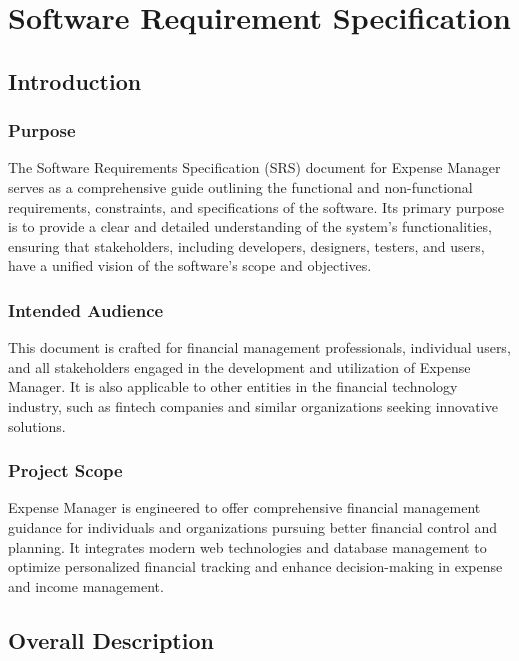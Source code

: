 \chapter{Software Requirement Specification}

\section{Introduction}

\subsection{Purpose}

The Software Requirements Specification (SRS) document for Expense Manager serves as a comprehensive guide outlining the functional and non-functional requirements, constraints, and specifications of the software. Its primary purpose is to provide a clear and detailed understanding of the system's functionalities, ensuring that stakeholders, including developers, designers, testers, and users, have a unified vision of the software's scope and objectives.

\subsection{Intended Audience}

This document is crafted for financial management professionals, individual users, and all stakeholders engaged in the development and utilization of Expense Manager. It is also applicable to other entities in the financial technology industry, such as fintech companies and similar organizations seeking innovative solutions.

\subsection{Project Scope}

Expense Manager is engineered to offer comprehensive financial management guidance for individuals and organizations pursuing better financial control and planning. It integrates modern web technologies and database management to optimize personalized financial tracking and enhance decision-making in expense and income management.

\section{Overall Description}

